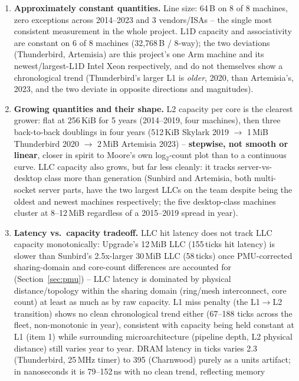\documentclass{article}
\begin{document}
\begin{enumerate}
    \item \textbf{Approximately constant quantities.} Line size: 64\,B on 8 of 8 machines,
    zero exceptions across 2014--2023 and 3 vendors/ISAs -- the single most consistent
    measurement in the whole project. L1D capacity and associativity are constant on 6 of 8
    machines (32,768\,B / 8-way); the two deviations (Thunderbird, Artemisia) are this
    project's one Arm machine and its newest/largest-L1D Intel Xeon respectively, and do not
    themselves show a chronological trend (Thunderbird's larger L1 is \emph{older},
    2020, than Artemisia's, 2023, and the two deviate in opposite directions and magnitudes).
    \item \textbf{Growing quantities and their shape.} L2 capacity per core is the clearest
    grower: flat at 256\,KiB for 5 years (2014--2019, four machines), then three back-to-back
    doublings in four years (512\,KiB Skylark 2019 $\to$ 1\,MiB Thunderbird 2020 $\to$
    2\,MiB Artemisia 2023) -- \textbf{stepwise, not smooth or linear}, closer in spirit to
    Moore's own log$_2$-count plot than to a continuous curve. LLC capacity also grows, but
    far less cleanly: it tracks server-vs-desktop class more than generation (Sunbird and
    Artemisia, both multi-socket server parts, have the two largest LLCs on the team despite
    being the oldest and newest machines respectively; the five desktop-class machines cluster
    at 8--12\,MiB regardless of a 2015--2019 spread in year).
    \item \textbf{Latency vs.\ capacity tradeoff.} LLC hit latency does not track LLC capacity
    monotonically: Upgrade's 12\,MiB LLC (155\,ticks hit latency) is slower than Sunbird's
    2.5x-larger 30\,MiB LLC (58\,ticks) once PMU-corrected sharing-domain and core-count
    differences are accounted for (Section~\ref{sec:pmu}) -- LLC latency is dominated by
    physical distance/topology within the sharing domain (ring/mesh interconnect, core count)
    at least as much as by raw capacity. L1 miss penalty (the L1$\to$L2 transition) shows no
    clean chronological trend either (67--188 ticks across the fleet, non-monotonic in year),
    consistent with capacity being held constant at L1 (item 1) while surrounding
    microarchitecture (pipeline depth, L2 physical distance) still varies year to year.
    DRAM latency in ticks varies 2.3 (Thunderbird, 25\,MHz timer) to 395 (Charnwood) purely as
    a units artifact; in nanoseconds it is 79--152\,ns with no clean trend, reflecting memory

\end{enumerate}
\end{document}
